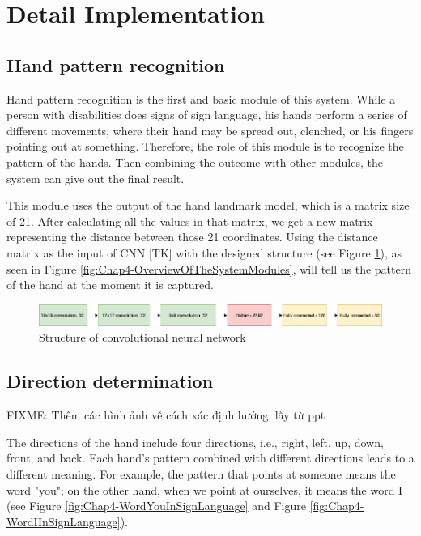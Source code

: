 \section{Detail Implementation}

\subsection{Hand pattern recognition}

Hand pattern recognition is the first and basic module of this system. While a person with disabilities does signs of sign language, his hands perform a series of different movements, where their hand may be spread out, clenched, or his fingers pointing out at something. Therefore, the role of this module is to recognize the pattern of the hands. Then combining the outcome with other modules, the system can give out the final result.

This module uses the output of the hand landmark model, which is a matrix size of 21. After calculating all the values in that matrix, we get a new matrix representing the distance between those 21 coordinates. Using the distance matrix as the input of CNN [TK] with the designed structure (see Figure \ref{fig:Chap4-StructureOfConvolutionalNeuralNetwork}), as seen in Figure \ref{fig:Chap4-OverviewOfTheSystemModules}, will tell us the pattern of the hand at the moment it is captured.

\begin{figure}[H]
	\centering
	\includegraphics[width=\textwidth]{img/Chap4/StructureOfConvolutionalNeuralNetwork.png}
	\caption{Structure of convolutional neural network}
	\label{fig:Chap4-StructureOfConvolutionalNeuralNetwork}
\end{figure}

\subsection{Direction determination}
FIXME: Thêm các hình ảnh về cách xác định hướng, lấy từ ppt

The directions of the hand include four directions, i.e., right, left, up, down, front, and back. Each hand's pattern combined with different directions leads to a different meaning. For example, the pattern that points at someone means the word "you"; on the other hand, when we point at ourselves, it means the word I (see Figure \ref{fig:Chap4-WordYouInSignLanguage} and Figure \ref{fig:Chap4-WordIInSignLanguage}).


